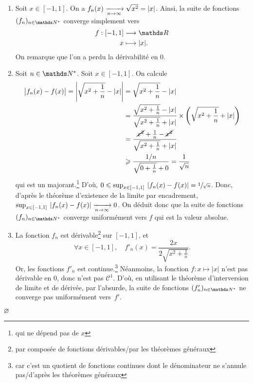 \begin{exo}
	\begin{enumerate}
		\item Soit $x \in [-1,1]$. On a $f_n(x) \tendsto{n\to \infty} \sqrt{x^2} = |x|$. Ainsi, la suite de fonctions $(f_n)_{n\in\N^*}$\/ converge simplement vers  \begin{align*}
				f: [-1,1] &\longrightarrow \R \\
				x &\longmapsto |x|.
			\end{align*}
			On remarque que l'on a perdu la dérivabilité en $0$.
		\item Soit $n \in \N^*$. Soit $x \in [-1,1]$. On calcule
			\begin{align*}
				\big|f_n(x) - f(x)\big| = \left| \sqrt{x^2 + \frac{1}{n}} - |x| \right| &= \sqrt{x^2 + \frac{1}{n}}  - |x|\\
				&= \frac{\sqrt{x^2 + \frac{1}{n}} - |x|}{\sqrt{x^2 + \frac{1}{n}} + |x|} \times \left( \sqrt{x^2 + \frac{1}{n}}  + |x| \right) \\
				&= \frac{\cancel{x^2} + \frac{1}{n} - \cancel{x^2}}{\sqrt{x^2 + \frac{1}{n}} + |x|} \\
				&\ge \frac{1/n}{\sqrt{0 + \frac{1}{n}} + 0} = \frac{1}{\sqrt{n}}
			\end{align*}
			qui est un majorant.\footnote{qui ne dépend pas de $x$}
			D'où, $0 \le \sup_{x \in [-1,1]}\:|f_n(x) - f(x)| = \sfrac{1}{\sqrt{n}}$. Donc, d'après le théorème d'existence de la limite par encadrement, $\sup_{x \in [-1,1]}\:|f_n(x) - f(x)| \tendsto{n\to \infty} 0$. On déduit donc que la suite de fonctions $(f_n)_{n\in\N^*}$\/ converge uniformément vers $f$\/ qui est la valeur absolue.
		\item La fonction $f_n$\/ est dérivable\footnote{par composée de fonctions dérivables/par les théorèmes généraux} sur $[-1,1]$, et \[
			\forall x \in [-1,1],\quad f'_n(x) = \frac{2x}{2\sqrt{x^2 + \frac{1}{n}}}
		.\] Or, les fonctions $f'_n$\/ est continue.\footnote{car c'est un quotient de fonctions continues dont le dénominateur ne s'annule pas/d'après les théorèmes généraux} Néanmoins, la fonction $f : x \mapsto |x|$\/ n'est pas dérivable en $0$, donc n'est pas $\mathscr{C}^1$.
		D'où, en utilisant le théorème d'interversion de limite et de dérivée, par l'absurde, la suite de fonctions $(f'_n)_{n\in\N^*}$\/ ne converge pas uniformément vers~$f'$.
	\end{enumerate}
\end{exo}

\begin{met}
	$\O$\/
\end{met}

